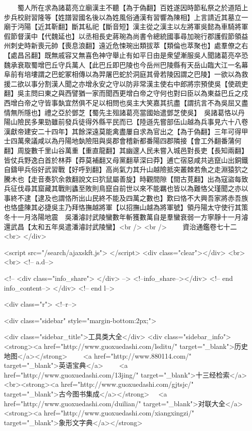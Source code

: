 　　蜀人所在求為諸葛亮立廟漢主不聽【為于偽翻】百姓遂因時節私祭之於道陌上步兵校尉習隆等【姓譜習國名後以為姓風俗通漢有習響為陳相】上言請近其墓立一廟于沔陽【近其靳翻】斷其私祀【斷音短】漢主從之漢主以左將軍吳懿為車騎將軍假節督漢中【代魏延也】以丞相長史蔣琬為尚書令總統國事尋加琬行郡護假節領益州刺史時新喪元帥【喪息浪翻】遠近危悚琬出類拔萃【類倫也萃聚也】處羣僚之右【處昌呂翻】既無戚容又無喜色神守舉止有如平日由是衆望漸服吳人聞諸葛亮卒恐魏承衰取蜀增巴丘守兵萬人【此巴丘即巴陵也今岳州巴陵縣有天岳山臨大江一名幕阜前有培塿謂之巴蛇冢相傳以為羿屠巴蛇於洞庭其骨若陵因謂之巴陵】一欲以為救援二欲以事分割漢人聞之亦增永安之守以防非常漢主使右中郎將宗預使吳【使疏吏翻】吳主問曰東之與西譬猶一家而聞西更增白帝之守何也對曰臣以為東益巴丘之戍西增白帝之守皆事埶宜然俱不足以相問也吳主大笑嘉其抗盡【謂抗言不為吳屈又盡情無所隱也】禮之亞於鄧芝【蜀先主殂諸葛亮當國始遣鄧芝使吳】　吳諸葛恪以丹陽山險民多果勁雖前發兵徒得外縣平民而已【陸遜先嘗部伍山越為兵事見六十八卷漢獻帝建安二十四年】其餘深遠莫能禽盡屢自求為官出之【為于偽翻】三年可得甲士四萬衆議咸以為丹陽地埶險阻與吳郡會稽新都番陽四郡隣接【會工外翻番蒲何翻】周旋數千里山谷萬重【重直龍翻】其幽邃人民未嘗入城邑對長吏【長知兩翻】皆仗兵野逸白首於林莽【莽莫補翻又母黨翻草深曰莽】逋亡宿惡咸共逃竄山出銅鐵自鑄甲兵俗好武習戰【好呼到翻】高尚氣力其升山越險抵突叢棘若魚之走淵猿狖之騰木也【走音奏狖余救翻說文曰狖鼠屬善旋】時觀間隙【間古莧翻】出為寇盜每致兵征伐尋其窟藏其戰則蠭至敗則鳥竄自前世以來不能羈也皆以為難恪父瑾聞之亦以事終不逮【逮及也謂恪所出山民終不能及四萬之數也】歎曰恪不大興吾家將赤吾族也恪盛陳其必捷吳主乃拜恪撫越將軍【以招撫山越為將軍號】領丹陽太守使行其策　冬十一月洛陽地震　吳潘濬討武陵蠻數年斬獲數萬自是羣蠻衰弱一方寧靜十一月濬還武昌【太和五年吳遣潘濬討武陵蠻】<br />
<br />
　　資治通鑑卷七十二  <br>
   </div> 

<script src="/search/ajaxskft.js"> </script>
 <div class="clear"></div>
<br>
<br>
 <!-- a.d-->

 <!--
<div class="info_share">
</div> 
-->
 <!--info_share--></div>   <!-- end info_content-->
  </div> <!-- end l-->

<div class="r">   <!--r-->



<div class="sidebar"  style="margin-bottom:2px;">

 
<div class="sidebar_title">工具类大全</div>
<div class="sidebar_info">
<strong><a href="http://www.guoxuedashi.com/lsditu/" target="_blank">历史地图</a></strong>　　
<a href="http://www.880114.com/" target="_blank">英语宝典</a>　　
<a href="http://www.guoxuedashi.com/13jing/" target="_blank">十三经检索</a>　
<br><strong><a href="http://www.guoxuedashi.com/gjtsjc/" target="_blank">古今图书集成</a></strong>　
<a href="http://www.guoxuedashi.com/duilian/" target="_blank">对联大全</a>　<strong><a href="http://www.guoxuedashi.com/xiangxingzi/" target="_blank">象形文字典</a></strong>　

